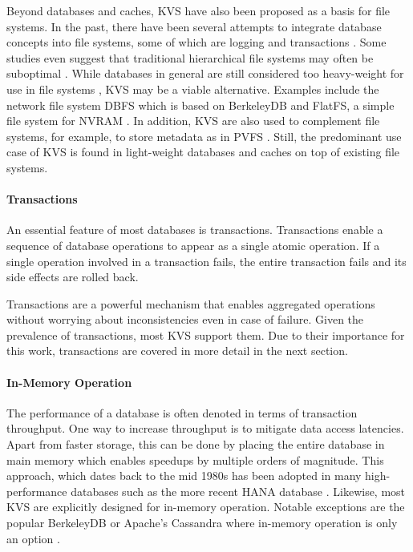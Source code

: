 Beyond databases and caches, \ac{KVS} have also been proposed as a basis for file
systems. In the past, there have been several attempts to integrate database
concepts into file systems, some of which are logging \cite{rosenblum1992design,
tweedie1998journaling} and transactions \cite{seltzer1990transaction,
wright2007extending, spillane2009enabling}. Some studies even suggest that
traditional hierarchical file systems may often be suboptimal
\cite{stein2005stupid, seltzer2009hierarchical}. While databases in general are
still considered too heavy-weight for use in file systems
\cite{seltzer2009hierarchical}, \ac{KVS} may be a viable alternative. Examples
include the network file system DBFS which is based on BerkeleyDB
\cite{murphy2002design} and FlatFS, a simple file system for \ac{NVRAM}
\cite{volos2014aerie}. In addition, \ac{KVS} are also used to complement file
systems, for example, to store metadata as in PVFS \cite{carns2009small}. Still,
the predominant use case of \ac{KVS} is found in light-weight databases and caches on
top of existing file systems.

\paragraph{Transactions}

An essential feature of most databases is transactions. Transactions enable a
sequence of database operations to appear as a single atomic operation. If a
single operation involved in a transaction fails, the entire transaction fails and its side effects are rolled back.

Transactions are a powerful mechanism that enables aggregated operations without
worrying about inconsistencies even in case of failure. Given the prevalence of
transactions, most \ac{KVS} support them. Due to their importance for this work,
transactions are covered in more detail in the next section.

\paragraph{In-Memory Operation}

The performance of a database is often denoted in terms of transaction
throughput. One way to increase throughput is to mitigate data access latencies.
Apart from faster storage, this can be done by placing the entire database in
main memory which enables speedups by multiple orders of magnitude. This
approach, which dates back to the mid 1980s has been adopted in many
high-performance databases such as the more recent HANA database
\cite{molina1992main, faerber2012hana}. Likewise, most \ac{KVS} are explicitly
designed for in-memory operation. Notable exceptions are the popular BerkeleyDB
or Apache's Cassandra where in-memory operation is only an option
\cite{bdb2017doc, lakshman2010cassandra}.

